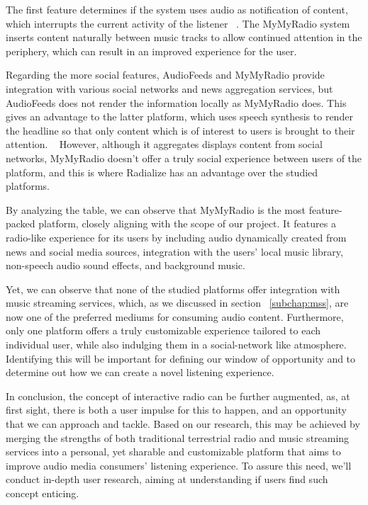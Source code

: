 The first feature determines if the system uses audio as notification of content, which interrupts the current activity of the listener ~\cite{Dingler2010}. The MyMyRadio system inserts content naturally between music tracks to allow continued attention in the periphery, which can result in an improved experience for the user.

Regarding the more social features, AudioFeeds and MyMyRadio provide integration with various social networks and news aggregation services, but AudioFeeds does not render the information locally as MyMyRadio does. This gives an advantage to the latter platform, which uses speech synthesis to render the headline so that only content which is of interest to users is brought to their attention. ~\cite{Aylett2015} However, although it aggregates displays content from social networks, MyMyRadio doesn't offer a truly social experience between users of the platform, and this is where Radialize has an advantage over the studied platforms.

By analyzing the table, we can observe that MyMyRadio is the most feature-packed platform, closely aligning with the scope of our project. It features a radio-like experience for its users by including audio dynamically created from news and social media sources, integration with the users' local music library, non-speech audio sound effects, and background music. 

Yet, we can observe that none of the studied platforms offer integration with music streaming services, which, as we discussed in section ~\ref{subchap:mss}, are now one of the preferred mediums for consuming audio content. Furthermore, only one platform offers a truly customizable experience tailored to each individual user, while also indulging them in a social-network like atmosphere. Identifying this will be important for defining our window of opportunity and to determine out how we can create a novel listening experience.

In conclusion, the concept of interactive radio can be further augmented, as, at first sight, there is both a user impulse for this to happen, and an opportunity that we can approach and tackle. Based on our research, this may be achieved by merging the strengths of both traditional terrestrial radio and music streaming services into a personal, yet sharable and customizable platform that aims to improve audio media consumers' listening experience. To assure this need, we'll conduct in-depth user research, aiming at understanding if users find such concept enticing.
